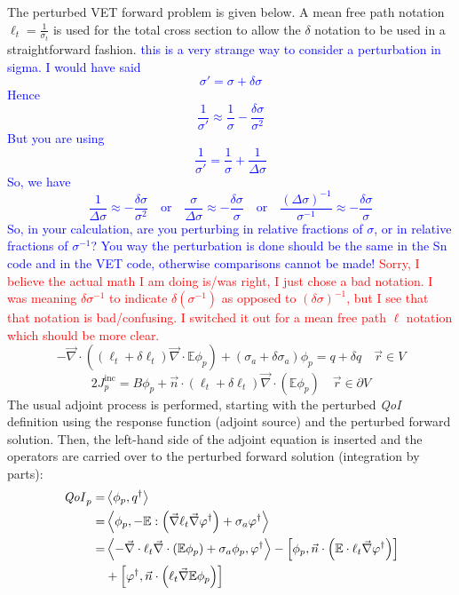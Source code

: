 \documentclass[12pt]{report}
\newcommand{\vr}{\vec{r}}
\newcommand{\bra}{\left\langle}
\newcommand{\ket}{\right\rangle}
\newcommand{\sbra}{\left[}
\newcommand{\sket}{\right]}
\renewcommand{\div}{\vec{\nabla} \cdot}
\newcommand{\grad}{\vec{\nabla}}
\newcommand{\vefadj}{\varphi^\dag}
\newcommand{\domain}{V}
\newcommand{\bound}{\partial V}
\newcommand{\vn}{\vec{n}}
\newcommand{\Edd}{\mathbb{E}}
\newcommand{\sigt}{\sigma_t}
\newcommand{\siga}{\sigma_a}
\newcommand{\isigt}{\ell_t}
\newcommand{\scalSource}{q}
\newcommand{\scalResp}{q^\dag}
\newcommand{\qoi}{{\it QoI}\xspace}
\newcommand{\comment}[2]{\marginpar{\textcolor{#2}{$\star$}}\textcolor{#2}{#1}\newline}
\newcommand{\iwh}[1]{\comment{#1}{red}}
\newcommand{\jcr}[1]{\comment{#1}{blue}}
\newcommand{\iwh}[1]{\phantom{a}}
\newcommand{\jcr}[1]{\phantom{a}}
\begin{document}
The perturbed VET forward problem is given below. A mean free path notation $\isigt=\frac{1}{\sigt}$ is used for the total
cross section to allow the $\delta$ notation to be used in a straightforward fashion.
\jcr{this is a very strange way to consider a perturbation in sigma. I would have said
\[ 
\sigma' =\sigma + \delta \sigma
\]
Hence
\[ 
\frac{1}{\sigma'} \approx \frac{1}{\sigma} - \frac{\delta\sigma}{\sigma^2}
\]
But you are using
\[
\frac{1}{\sigma'} = \frac{1}{\sigma} + \frac{1}{\Delta\sigma}
\]
So, we have
\[
\frac{1}{\Delta\sigma} \approx  - \frac{\delta\sigma}{\sigma^2} 
\quad \text{or} \quad
\frac{\sigma}{\Delta\sigma} \approx  - \frac{\delta\sigma}{\sigma} 
\quad \text{or} \quad
\frac{(\Delta\sigma)^{-1}}{\sigma^{-1}} \approx  - \frac{\delta\sigma}{\sigma} 
\]
So, in your calculation, are you perturbing in relative fractions of $\sigma$, or in relative fractions of $\sigma^{-1}$? You way the perturbation is done should be the same in the Sn code and in the VET code, otherwise comparisons cannot be made!
}
\iwh{Sorry, I believe the actual math I am doing is/was right, I just chose a bad notation. I was meaning $\delta \sigma^{-1}$ to indicate $\delta(\sigma^{-1})$ as opposed to $(\delta \sigma)^{-1}$, but I see that that notation is bad/confusing. I switched it out for a mean free path $\ell$ notation which should be more clear.}
\begin{subequations}
\begin{equation}
\label{VEFPert}
- \div \left((\isigt + \delta \isigt)\div \Edd \phi_p \right) + (\siga + \delta \siga)\phi_p = \scalSource + \delta \scalSource  \quad \vr \in \domain
\end{equation}
\end{subequations}
\begin{subequations}
\begin{equation}
 2J_p^\text{inc} = B \phi_p  + \vn \cdot  (\isigt + \delta \isigt) \vec{\nabla} \cdot \left(\Edd \phi_p \right)  \quad \vr \in \bound
\end{equation}
\end{subequations}
The usual adjoint process is performed, starting with the perturbed \qoi definition using the response function (adjoint source) and the perturbed forward solution. Then, the left-hand side of the adjoint equation is inserted and the operators are carried over to the perturbed forward solution (integration by parts):
\begin{equation}
\label{VETSensDeriv}
\begin{split}
\qoi_p = &\bra \phi_p , \scalResp \ket \\
       = &\bra \phi_p , - \Edd : \left( \grad \isigt \grad \varphi^\dag \right) + \siga \vefadj \ket \\
       = & \bra - \div \isigt \div \left( \Edd \phi_p \right) + \siga \phi_p, \vefadj \ket 
 - \sbra \phi_p , \vn \cdot \left( \Edd \cdot \isigt \grad \vefadj\right) \sket  \\ 
&+ \sbra \vefadj , \vn \cdot  \left(  \isigt \grad \Edd \phi_p \right) \sket \\
\end{split}
\end{equation}
\end{document}

